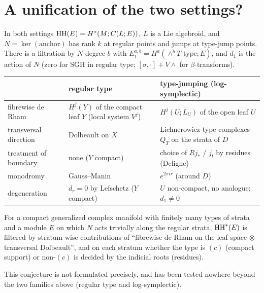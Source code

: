 \section{A unification of the two settings?}\label{sec:unified}
In both settings $\mathrm{HH}(E)=H^*(M;C(L;E))$, $L$ is a Lie algebroid, and $N=\ker(\text{anchor})$ has rank $k$ at regular points and jumps at type-jump points. There is a filtration by $N$-degree $b$ with $E_1^{a,b}=H^a(\wedge^bT\text{-type};E)$, and $d_1$ is the action of $N$ (zero for SGH in regular type; $[\sigma,\cdot]+V\wedge$ for $\beta$-transforms).
\begin{center}\small
\begin{tabular}{p{3.2cm}p{5.4cm}p{5.4cm}}\toprule
 & regular type & type-jumping (log-symplectic)\\\midrule
fibrewise de Rham & $H^j(Y)$ of the compact leaf $Y$ (local system $V^j$) & $H^j(U;L_U)$ of the open leaf $U$ \\\midrule
transversal direction & Dolbeault on $X$ & Lichnerowicz-type complexes $Q_T$ on the strata of $D$\\\midrule
treatment of boundary & none ($Y$ compact) & choice of $Rj_*$ / $j_!$ by residues (Deligne)\\\midrule
monodromy & Gauss--Manin & $e^{2\pi ir}$ (around $D$)\\\midrule
degeneration & $d_r=0$ by Lefschetz ($Y$ compact) & $U$ non-compact, no analogue; $d_1\neq0$\\\bottomrule
\end{tabular}
\end{center}
\begin{conj}\label{conj:U}
For a compact generalized complex manifold with finitely many types of strata and a module $E$ on which $N$ acts trivially along the regular strata, $\mathrm{HH}^*(E)$ is filtered by stratum-wise contributions of ``fibrewise de Rham on the leaf space $\otimes$ transversal Dolbeault'', and on each stratum whether the type is $(c)$ (compact support) or non-$(c)$ is decided by the indicial roots (residues).
\end{conj}
\noindent This conjecture is not formulated precisely, and has been tested nowhere beyond the two families above (regular type and log-symplectic).

